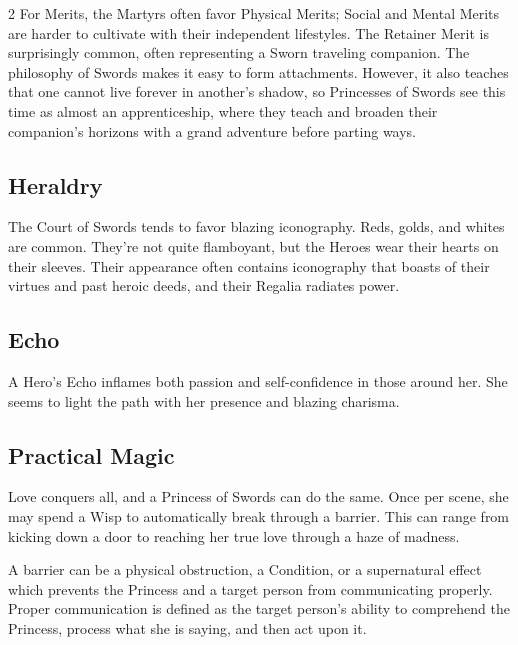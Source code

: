 \begin{multicols}{2}
For Merits, the Martyrs often favor Physical Merits; Social and Mental Merits are harder to cultivate with their independent lifestyles. The Retainer Merit is surprisingly common, often representing a Sworn traveling companion. The philosophy of Swords makes it easy to form attachments. However, it also teaches that one cannot live forever in another's shadow, so Princesses of Swords see this time as almost an apprenticeship, where they teach and broaden their companion's horizons with a grand adventure before parting ways.

\subsection*{Heraldry}

The Court of Swords tends to favor blazing iconography. Reds, golds, and whites are common. They're not quite flamboyant, but the Heroes wear their hearts on their sleeves. Their appearance often contains iconography that boasts of their virtues and past heroic deeds, and their Regalia radiates power. 

\subsection*{Echo}

A Hero's Echo inflames both passion and self-confidence in those around her. She seems to light the path with her presence and blazing charisma. 

\subsection*{Practical Magic}

Love conquers all, and a Princess of Swords can do the same. Once per scene, she may spend a Wisp to automatically break through a barrier. This can range from kicking down a door to reaching her true love through a haze of madness.  

A barrier can be a physical obstruction, a Condition, or a supernatural effect which prevents the Princess and a target person from communicating properly. Proper communication is defined as the target person's ability to comprehend the Princess, process what she is saying, and then act upon it.


\end{multicols}
